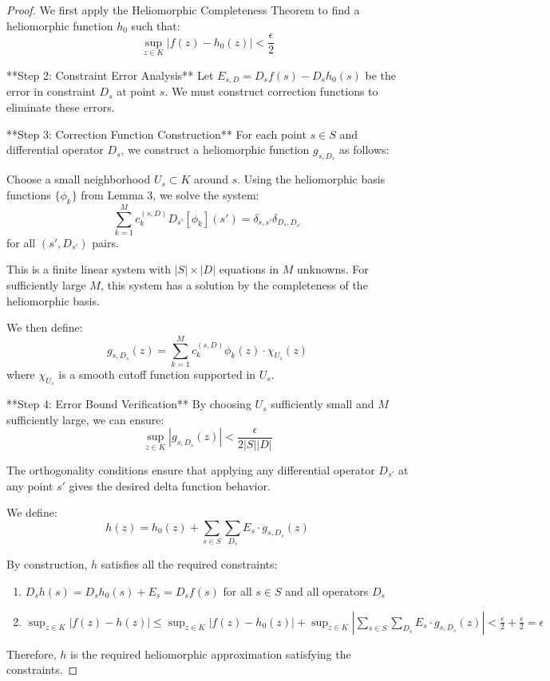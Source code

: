 \begin{proof}
We first apply the Heliomorphic Completeness Theorem to find a heliomorphic function $h_0$ such that:
\begin{equation}
\sup_{z \in K} |f(z) - h_0(z)| < \frac{\epsilon}{2}
\end{equation}

**Step 2: Constraint Error Analysis**
Let $E_{s,D} = D_sf(s) - D_sh_0(s)$ be the error in constraint $D_s$ at point $s$. We must construct correction functions to eliminate these errors.

**Step 3: Correction Function Construction**
For each point $s \in S$ and differential operator $D_s$, we construct a heliomorphic function $g_{s,D_s}$ as follows:

Choose a small neighborhood $U_s \subset K$ around $s$. Using the heliomorphic basis functions $\{\phi_k\}$ from Lemma 3, we solve the system:
$$\sum_{k=1}^{M} c_k^{(s,D)} D_{s'}[\phi_k](s') = \delta_{s,s'}\delta_{D_s,D_{s'}}$$
for all $(s', D_{s'})$ pairs.

This is a finite linear system with $|S| \times |D|$ equations in $M$ unknowns. For sufficiently large $M$, this system has a solution by the completeness of the heliomorphic basis.

We then define:
$$g_{s,D_s}(z) = \sum_{k=1}^{M} c_k^{(s,D)} \phi_k(z) \cdot \chi_{U_s}(z)$$
where $\chi_{U_s}$ is a smooth cutoff function supported in $U_s$.

**Step 4: Error Bound Verification**
By choosing $U_s$ sufficiently small and $M$ sufficiently large, we can ensure:
$$\sup_{z \in K} |g_{s,D_s}(z)| < \frac{\epsilon}{2|S||D|}$$

The orthogonality conditions ensure that applying any differential operator $D_{s'}$ at any point $s'$ gives the desired delta function behavior.

We define:
\begin{equation}
h(z) = h_0(z) + \sum_{s \in S}\sum_{D_s} E_s \cdot g_{s,D_s}(z)
\end{equation}

By construction, $h$ satisfies all the required constraints:
\begin{enumerate}
    \item $D_sh(s) = D_sh_0(s) + E_s = D_sf(s)$ for all $s \in S$ and all operators $D_s$
    \item $\sup_{z \in K} |f(z) - h(z)| \leq \sup_{z \in K} |f(z) - h_0(z)| + \sup_{z \in K} \left|\sum_{s \in S}\sum_{D_s} E_s \cdot g_{s,D_s}(z)\right| < \frac{\epsilon}{2} + \frac{\epsilon}{2} = \epsilon$
\end{enumerate}

Therefore, $h$ is the required heliomorphic approximation satisfying the constraints.
\end{proof}

